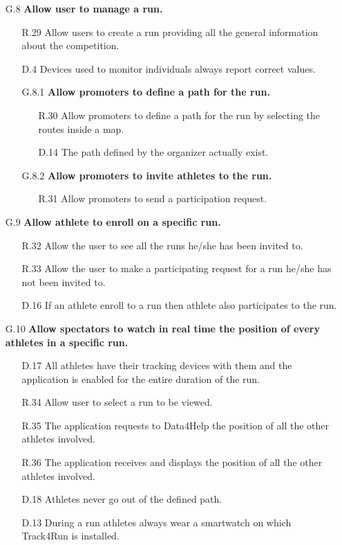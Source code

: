 \begin{enumerate}
\begin{enumerate}
	\item [G.8] \textbf{Allow user to manage a run.}
		\begin{enumerate}
		\item [R.29] Allow users to create a run providing all the general information about the competition.
		\item [D.4] Devices used to monitor individuals always report correct values.
			
		\item [G.8.1] \textbf{Allow promoters to define a path for the run.}
			\begin{enumerate}
			\item [R.30] Allow promoters to define a path for the run by selecting the routes inside a map.
			\item [D.14] The path defined by the organizer actually exist.
			\end{enumerate}
			
		\item [G.8.2] \textbf{Allow promoters to invite athletes to the run.}
			\begin{enumerate}
			\item [R.31] Allow promoters to send a participation request.
			\end{enumerate}
	\end{enumerate}
	
	\item [G.9] \textbf{Allow athlete to enroll on a specific run.}
		\begin{enumerate}
		\item [R.32] Allow the user to see all the runs he/she has been invited to.
		\item [R.33] Allow the user to make a participating request for a run he/she has not been invited to.
		\item [D.16] If an athlete enroll to a run then athlete also participates to the run.
		\end{enumerate}
	
	\item [G.10] \textbf{Allow spectators to watch in real time the position of every athletes in a specific run.}
		\begin{enumerate}
		\item [D.17] All athletes have their tracking devices with them and the application is enabled for the entire duration of the run.	
		\item [R.34] Allow user to select a run to be viewed.
		\item [R.35] The application requests to Data4Help the position of all the other athletes involved.
		\item [R.36] The application receives and displays the position of all the other athletes involved.
		\item [D.18] Athletes never go out of the defined path.
		\item [D.13] During a run athletes always wear a smartwatch on which Track4Run is installed.
		\end{enumerate}
	\end{enumerate}

\end{enumerate}



